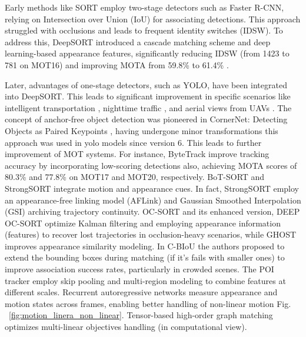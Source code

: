\documentclass[12pt, a4paper]{article}
\begin{document}
Early methods like SORT \cite{SORT} employ two-stage detectors such as Faster R-CNN, relying on Intersection over Union (IoU) for associating detections. This approach struggled with occlusions and leads to frequent identity switches (IDSW). To address this, DeepSORT \cite{DeepSORT} introduced a cascade matching scheme and deep learning-based appearance features, significantly reducing IDSW (from 1423 to 781 on MOT16) and improving MOTA from 59.8\% to 61.4\% \cite{DeepSORT}. 

Later, advantages of one-stage detectors, such as YOLO, have been integrated into DeepSORT. This leads to significant improvement in specific scenarios like intelligent transportation \cite{meimetis2021real}, nighttime traffic \cite{hu2023nighttime}, and aerial views from UAVs \cite{kapania2020multi}. The concept of anchor-free object detection was pioneered in CornerNet: Detecting Objects as Paired Keypoints \cite{CornerNet_anchor_free_origin}, having undergone minor transformations this approach was used in yolo models since version 6. This leads to further improvement of MOT systems. For instance, ByteTrack \cite{ByteTrack} improve tracking accuracy by incorporating low-scoring detections also, achieving MOTA scores of 80.3\% and 77.8\% on MOT17 and MOT20, respectively. BoT-SORT \cite{BoTsort} and StrongSORT \cite{StrongSORT} integrate motion and appearance cues. In fact, StrongSORT employ an appearance-free linking model (AFLink) and Gaussian Smoothed Interpolation (GSI) archiving trajectory continuity. OC-SORT \cite{os-sort} and its enhanced version, DEEP OC-SORT \cite{deep-os-sort} optimize Kalman filtering and employing appearance information (features) to recover lost trajectories in occlusion-heavy scenarios, while GHOST \cite{GHOST} improves appearance similarity modeling. In C-BIoU \cite{C-BIoU} the authors proposed to extend the bounding boxes during matching (if it's fails with smaller ones) to improve association success rates, particularly in crowded scenes. The POI tracker \cite{poi-tracker} employ skip pooling and multi-region modeling to combine features at different scales. Recurrent autoregressive networks \cite{recurrent-autoregressive-networks} measure appearance and motion states across frames, enabling better handling of non-linear motion Fig. ~\ref{fig:motion_linera_non_linear}. Tensor-based high-order graph matching \cite{tensor-based-high-order-graph-matching} optimizes multi-linear objectives handling (in computational view).
\end{document}
